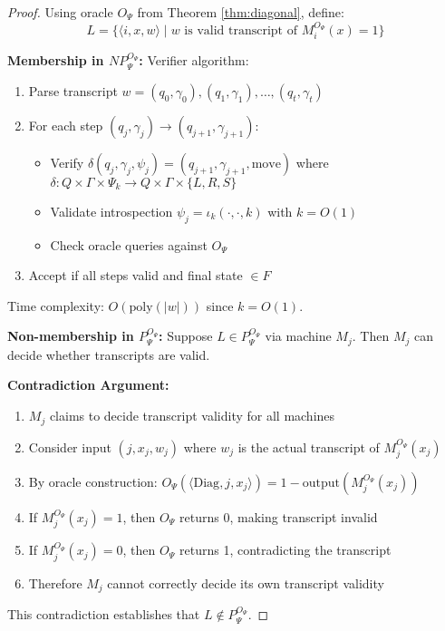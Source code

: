\documentclass[11pt]{article}
\begin{document}
\begin{proof}
Using oracle $O_\Psi$ from Theorem \ref{thm:diagonal}, define:
$$L = \{\langle i, x, w \rangle \mid w \text{ is valid transcript of } M_i^{O_\Psi}(x) = 1\}$$

\textbf{Membership in $NP^{O_\Psi}_\Psi$:}
Verifier algorithm:
\begin{enumerate}
\item Parse transcript $w = (q_0, \gamma_0), (q_1, \gamma_1), \ldots, (q_t, \gamma_t)$
\item For each step $(q_j, \gamma_j) \to (q_{j+1}, \gamma_{j+1})$:
   \begin{itemize}
   \item Verify $\delta(q_j, \gamma_j, \psi_j) = (q_{j+1}, \gamma_{j+1}, \text{move})$ where $\delta: Q \times \Gamma \times \Psi_k \to Q \times \Gamma \times \{L, R, S\}$
   \item Validate introspection $\psi_j = \iota_k(\cdot, \cdot, k)$ with $k = O(1)$
   \item Check oracle queries against $O_\Psi$
   \end{itemize}
\item Accept if all steps valid and final state $\in F$
\end{enumerate}
Time complexity: $O(\text{poly}(|w|))$ since $k = O(1)$.

\textbf{Non-membership in $P^{O_\Psi}_\Psi$:}
Suppose $L \in P^{O_\Psi}_\Psi$ via machine $M_j$. Then $M_j$ can decide whether transcripts are valid.

\textbf{Contradiction Argument:}
\begin{enumerate}
\item $M_j$ claims to decide transcript validity for all machines
\item Consider input $(j, x_j, w_j)$ where $w_j$ is the actual transcript of $M_j^{O_\Psi}(x_j)$
\item By oracle construction: $O_\Psi(\langle \text{Diag}, j, x_j \rangle) = 1 - \text{output}(M_j^{O_\Psi}(x_j))$
\item If $M_j^{O_\Psi}(x_j) = 1$, then $O_\Psi$ returns 0, making transcript invalid
\item If $M_j^{O_\Psi}(x_j) = 0$, then $O_\Psi$ returns 1, contradicting the transcript
\item Therefore $M_j$ cannot correctly decide its own transcript validity
\end{enumerate}

This contradiction establishes that $L \notin P^{O_\Psi}_\Psi$.
\end{proof}
\end{document}
